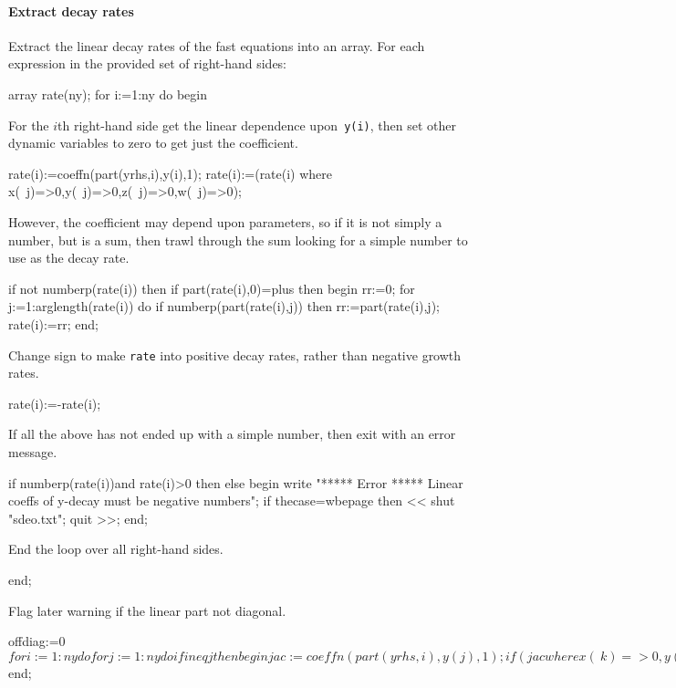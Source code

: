 \documentclass[11pt,a5paper]{article}
\begin{document}
\paragraph{Extract decay rates}
Extract the linear decay rates of the fast equations into an array.
For each expression in the provided set of right-hand sides:
\begin{reduce}
array rate(ny);
for i:=1:ny do begin
\end{reduce}

For the $i$th right-hand side get the linear dependence upon~\verb|y(i)|, then set other dynamic variables to zero to get just the coefficient.
\begin{reduce}
  rate(i):=coeffn(part(yrhs,i),y(i),1);
  rate(i):=(rate(i) where {x(~j)=>0,y(~j)=>0,z(~j)=>0,w(~j)=>0});
\end{reduce}

However, the coefficient may depend upon parameters, so if it is not simply a number, but is a sum, then trawl through the sum looking for a simple number to use as the decay rate.
\begin{reduce}
  if not numberp(rate(i)) then 
  if part(rate(i),0)=plus then begin
    rr:=0;
    for j:=1:arglength(rate(i)) do 
      if numberp(part(rate(i),j)) 
      then rr:=part(rate(i),j);
    rate(i):=rr;
  end;
\end{reduce}

Change sign to make \verb|rate| into positive decay rates, rather than negative growth rates.
\begin{reduce}
  rate(i):=-rate(i); 
\end{reduce}

If all the above has not ended up with a simple number, then exit with an error message. 
\begin{reduce}
  if numberp(rate(i))and rate(i)>0 then
  else begin 
    write "***** Error *****
    Linear coeffs of y-decay must be negative numbers";
    if thecase=wbepage then <<
      shut "sdeo.txt"; quit >>;
  end;
\end{reduce}

End the loop over all right-hand sides.
\begin{reduce}
end;
\end{reduce}

Flag later warning if the linear part not diagonal.
\begin{reduce}
offdiag:=0$
for i:=1:ny do for j:=1:ny do if i neq j then begin
  jac:=coeffn(part(yrhs,i),y(j),1);
  if (jac where {x(~k)=>0,y(~k)=>0,z(~k)=>0,w(~k)=>0}) neq 0 
  then offdiag:=1$
end;
\end{reduce}
\end{document}
